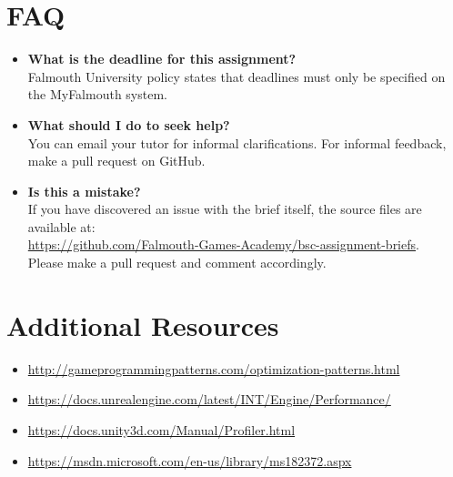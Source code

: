 \documentclass{../../fal_assignment}
\begin{document}
\section*{FAQ}

\begin{itemize}
	\item 	\textbf{What is the deadline for this assignment?} \\ 
    		Falmouth University policy states that deadlines must only be specified on the MyFalmouth system.
    		
	\item 	\textbf{What should I do to seek help?} \\ 
    		You can email your tutor for informal clarifications. For informal feedback, make a pull request on GitHub. 
    		
    	\item 	\textbf{Is this a mistake?} \\ 	
    		If you have discovered an issue with the brief itself, the source files are available at: \\
    		\url{https://github.com/Falmouth-Games-Academy/bsc-assignment-briefs}.\\
    		 Please make a pull request and comment accordingly.
\end{itemize}

\section*{Additional Resources}

\begin{itemize}
    \item \url{http://gameprogrammingpatterns.com/optimization-patterns.html}
    \item \url{https://docs.unrealengine.com/latest/INT/Engine/Performance/}
    \item \url{https://docs.unity3d.com/Manual/Profiler.html}
    \item \url{https://msdn.microsoft.com/en-us/library/ms182372.aspx}
\end{itemize}
\end{document}
